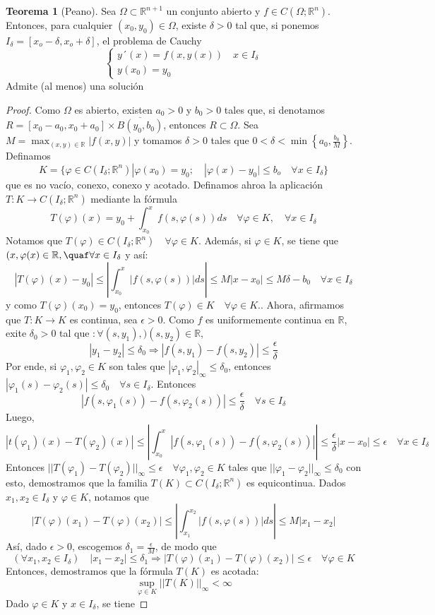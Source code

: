 \documentclass[11pt]{article}
\theoremstyle{definition} %
\newtheorem{theorem}{Teorema}[section]
\newcommand{\R}{\mathbb{R}}
\begin{document}
\begin{theorem}[Peano] Sea $\Omega \subset \R^{n+1}$ un conjunto abierto y $f \in C(\Omega;\R^n)$. Entonces, para cualquier $(x_0,y_0)\in \Omega$, existe $\delta>0$ tal que, si ponemos $I_{\delta}=[x_o-\delta,x_o+\delta]$, el problema de Cauchy
  \[
    \begin{cases}
      y´(x)=f(x,y(x)) \quad x \in I_{\delta} \\ y(x_0)=y_0
    \end{cases}
  \]
  Admite (al menos) una solución
\end{theorem}

\begin{proof}
  Como $\Omega$ es abierto, existen $a_0>0$ y $b_0>0$ tales que, si denotamos $R=[x_0-a_0,x_0+a_0]\times \overline{B(y_0,b_0)}$, entonces $R \subset \Omega$. Sea $M=\max_{(x,y)\in \R}|f(x,y)|$ y tomamos $\delta > 0$ tales que $0 < \delta < \min\left\{a_0, \frac{b_0}{M}\right\}$. Definamos 
  \[  K=\{\varphi \in C(I_{\delta};\R^n)| \varphi(x_0)=y_0;\quad |\varphi(x)-y_0|\leq b_o \quad \forall x \in I_{\delta}\}\]
  que es no vacío, conexo, conexo y acotado. Definamos ahroa la aplicación $T:K\rightarrow C(I_{\delta};\R^n)$ mediante la fórmula 
  \[ T(\varphi)(x)=y_0 + \int_{x_0}^{x} f(s,\varphi(s))ds \quad \forall \varphi \in K, \quad \forall x \in I_{\delta}\]
  Notamos que $T(\varphi)\in C(I_{\delta};\R^n) \quad \forall \varphi \in K$. Además, si $\varphi \in K$, se tiene que $(x,\varphi(x)\in \R, \quaf \forall x \in I_{\delta}$ y así:
  \[ |T(\varphi)(x)-y_0|\leq \left| \int_{x_0}^{x}|f(s,\varphi(s))|ds \right| \leq M|x-x_0|\leq M\delta -b_0 \quad \forall x \in I_{\delta} \]
  y como $T(\varphi)(x_0)=y_0$, entonces $T(\varphi)\in K\quad \forall \varphi \in K.$. Ahora, afirmamos que $T:K\rightarrow K$ es continua, sea $\epsilon >0$. Como $f$ es uniformemente continua en $\R$, exite $\delta_0 >0$ tal que $:\forall(s,y_1),)(s,y_2)\in \R$, 
  \[|y_1-y_2|\leq \delta_0 \Rightarrow |f(s,y_1)-f(s,y_2)|\leq \frac{\epsilon}{\delta}\]
  Por ende, si $\varphi_1,\varphi_2 \in K$ son tales que $|\varphi_1,\varphi_2|_{\infty}\leq \delta_0$, entonces $|\varphi_1(s)-\varphi_2(s)|\leq \delta_0\quad \forall s \in I_{\delta}$. Entonces 
  \[ |f(s,\varphi_1(s))-f(s,\varphi_2(s))|\leq \frac{\epsilon}{\delta}\quad \forall s \in I_{\delta} \]
  Luego,
  \[|t(\varphi_1)(x)-T(\varphi_2)(x)|\leq \left|\int_{x_0}^{x}|f(s,\varphi_1(s))-f(s,\varphi_2(s))|\right| \leq \frac{\epsilon}{\delta}|x-x_0|\leq \epsilon \quad \forall x \in I_{\delta}\]
  Entonces $||T(\varphi_1)-T(\varphi_2)||_{\infty}\leq \epsilon \quad \forall \varphi_1,\varphi_2\in K$ tales que $||\varphi_1 -\varphi_2||_{\infty} \leq \delta_0$ con esto, demostramos que la familia $T(K)\subset C(I_{\delta};\R^n)$ es equicontinua. Dados $x_1,x_2 \in I_{\delta}$ y $\varphi \in K$, notamos que \[|T(\varphi)(x_1) - T(\varphi)(x_2)| \leq \left|\int_{x_1}^{x_2}|f(s,\varphi(s))|ds \right|\leq M|x_1 - x_2|  \] Así, dado $\epsilon > 0$, escogemos $\delta_1 = \frac{\epsilon}{M}$, de modo que \[ (\forall x_1,x_2 \in I_{\delta}) \quad |x_1 - x_2| \leq \delta_1 \Rightarrow |T(\varphi)(x_1) - T(\varphi)(x_2)| \leq \epsilon \quad \forall \varphi \in K \] Entonces, demostramos que la fórmula $T(K)$ es acotada: \[ \sup_{\varphi \in K} ||T(K)||_{\infty} < \infty \] Dado $\varphi \in K$ y $x \in I_{\delta}$, se tiene 

\end{proof}
\end{document}
